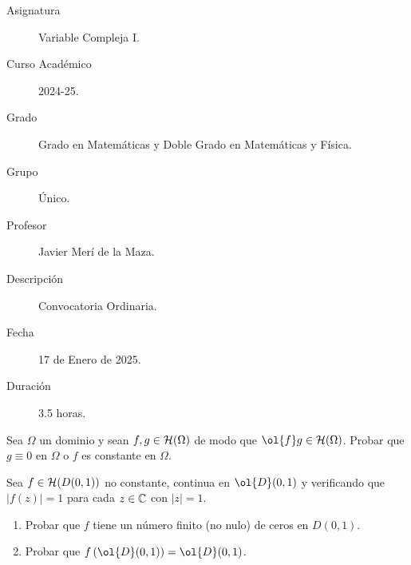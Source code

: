 \documentclass[12pt]{article}
\begin{document}

    
    

    \begin{description}
        \item[Asignatura] Variable Compleja I.
        \item[Curso Académico] 2024-25.
        \item[Grado] Grado en Matemáticas y Doble Grado en Matemáticas y Física.
        \item[Grupo] Único.
        \item[Profesor] Javier Merí de la Maza.
        \item[Descripción] Convocatoria Ordinaria.
        \item[Fecha] 17 de Enero de 2025.
        \item[Duración] 3.5 horas.
    \end{description}
    \newpage

    \begin{ejercicio}[2.5 puntos]
        Sea $\Omega$ un dominio y sean $f, g \in \mathcal{H}(\Omega)$ de modo que $\ol{f}g\in \cc{H}(\Omega)$.
        Probar que $g \equiv 0$ en $\Omega$ o $f$ es constante en $\Omega$.        
    \end{ejercicio}

    \begin{ejercicio}[2.5 puntos]
        Sea $f \in \mathcal{H}(D(0, 1))$ no constante, continua en $\ol{D}(0, 1)$ y verificando que $|f(z)| = 1$ para cada $z \in \mathbb{C}$ con $|z| = 1$.
        \begin{enumerate}
            \item Probar que $f$ tiene un número finito (no nulo) de ceros en $D(0, 1)$.
            \item Probar que $f\left(\ol{D}(0, 1)\right) = \ol{D}(0, 1)$.
        \end{enumerate}
    \end{ejercicio}
\end{document}
